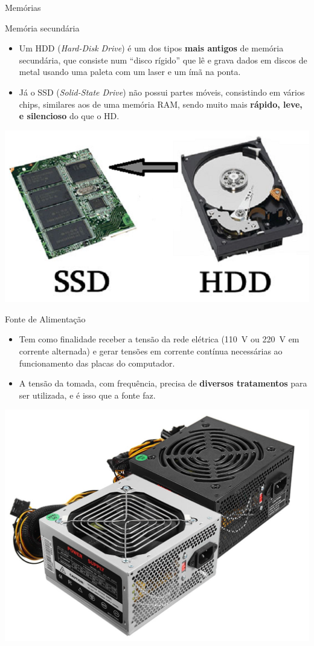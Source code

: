 \begin{frame}{Memórias}
	\begin{block}{Memória secundária}
		\begin{itemize}
			\item Um HDD (\textit{Hard-Disk Drive}) é um dos tipos \textbf{mais antigos} de memória secundária, que consiste num ``disco rígido'' que lê e grava dados em discos de metal usando uma paleta com um laser e um ímã na ponta.
			\item Já o SSD (\textit{Solid-State Drive}) não possui partes móveis, consistindo em vários chips, similares aos de uma memória RAM, sendo muito mais \textbf{rápido, leve, e silencioso} do que o HD.
		\end{itemize}
	\end{block}

	\centering
	\includegraphics[width=0.6\linewidth]{Figuras/Ch02/fig8}
\end{frame}


\begin{frame}{Fonte de Alimentação}
	\begin{block}{}
		\begin{itemize}
			\item Tem como finalidade receber a tensão da rede elétrica (\SI{110}{\volt} ou \SI{220}{\volt} em corrente alternada) e gerar tensões em corrente contínua necessárias ao funcionamento das placas do computador.
			\item A tensão da tomada, com frequência, precisa de \textbf{diversos tratamentos} para ser utilizada, e é isso que a fonte faz.
		\end{itemize}
	\end{block}

	\centering
	\includegraphics[width=0.55\linewidth]{Figuras/Ch02/fig9}
\end{frame}


